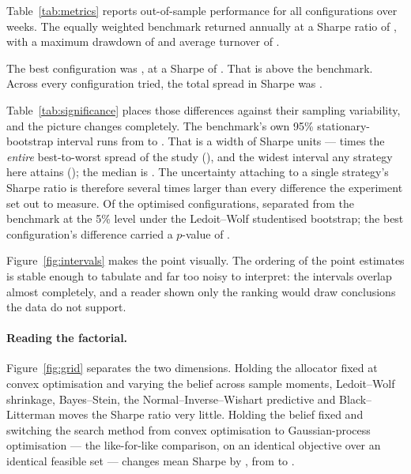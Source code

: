 
Table~\ref{tab:metrics} reports out-of-sample performance for all \nTrials{}
configurations over \oosPeriods{} weeks. The equally weighted benchmark returned
\benchReturn{} annually at a Sharpe ratio of \benchSharpe{}, with a maximum
drawdown of \benchDrawdown{} and average turnover of \benchTurnover{}.

The best configuration was \bestName{}, at a Sharpe of \bestSharpe{}. That is
\bestSharpeGap{} above the benchmark. Across every configuration tried, the total
spread in Sharpe was \sharpeSpread{}.

Table~\ref{tab:significance} places those differences against their sampling
variability, and the picture changes completely. The benchmark's own 95\%
stationary-bootstrap interval runs from \benchCILow{} to \benchCIHigh{}. That is a
width of \benchCIWidth{} Sharpe units --- \ciSpreadRatio{} times the \emph{entire}
best-to-worst spread of the study (\sharpeSpread{}), and the widest interval any
strategy here attains (\widestCI{}); the median is \medianCI{}. The uncertainty
attaching to a single strategy's Sharpe ratio is therefore several times larger
than every difference the experiment set out to measure. Of the \nStrategies{}
optimised configurations,
\nBeatingBenchmark{} separated from the benchmark at the 5\% level under the
Ledoit--Wolf studentised bootstrap; the best configuration's difference carried a
$p$-value of \bestPValue{}.

Figure~\ref{fig:intervals} makes the point visually. The ordering of the point
estimates is stable enough to tabulate and far too noisy to interpret: the
intervals overlap almost completely, and a reader shown only the ranking would
draw conclusions the data do not support.

\paragraph{Reading the factorial.} Figure~\ref{fig:grid} separates the two
dimensions. Holding the allocator fixed at convex optimisation and varying the
belief across sample moments, Ledoit--Wolf shrinkage, Bayes--Stein, the
Normal--Inverse--Wishart predictive and Black--Litterman moves the Sharpe ratio
very little. Holding the belief fixed and switching the search method from convex
optimisation to Gaussian-process optimisation --- the like-for-like comparison, on
an identical objective over an identical feasible set --- changes mean Sharpe by
\optimiserGap{}, from \convexMeanSharpe{} to \gpMeanSharpe{}.

